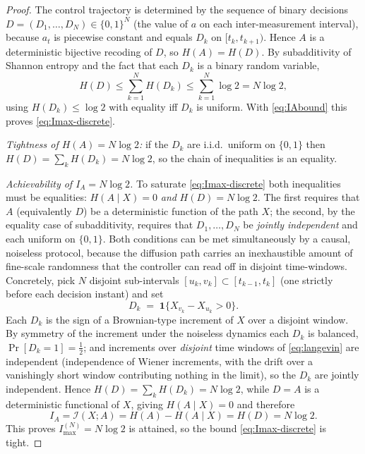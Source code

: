 \documentclass{amsart}
\theoremstyle{definition}
\begin{document}
\begin{proof}
The control trajectory is determined by the sequence of binary decisions
$D=(D_1,\dots,D_N)\in\{0,1\}^N$ (the value of $a$ on each inter-measurement
interval), because $a_t$ is piecewise constant and equals $D_k$ on
$[t_k,t_{k+1})$. Hence $A$ is a deterministic bijective recoding of $D$, so
$H(A)=H(D)$. By subadditivity of Shannon entropy and the fact that each $D_k$
is a binary random variable,
\[
H(D)\le\sum_{k=1}^N H(D_k)\le \sum_{k=1}^N \log 2 = N\log 2,
\]
using $H(D_k)\le\log 2$ with equality iff $D_k$ is uniform. With
\eqref{eq:IAbound} this proves \eqref{eq:Imax-discrete}.

\emph{Tightness of $H(A)=N\log2$:} if the $D_k$ are i.i.d.\ uniform on
$\{0,1\}$ then $H(D)=\sum_k H(D_k)=N\log2$, so the chain of inequalities is an
equality.

\emph{Achievability of $I_A=N\log 2$.} To saturate \eqref{eq:Imax-discrete}
both inequalities must be equalities: $H(A\mid X)=0$ \emph{and} $H(D)=N\log2$.
The first requires that $A$ (equivalently $D$) be a deterministic function of
the path $X$; the second, by the equality case of subadditivity, requires that
$D_1,\dots,D_N$ be \emph{jointly independent} and each uniform on $\{0,1\}$.
Both conditions can be met simultaneously by a causal, noiseless protocol,
because the diffusion path carries an inexhaustible amount of fine-scale
randomness that the controller can read off in disjoint time-windows. Concretely,
pick $N$ disjoint sub-intervals $[u_k,v_k]\subset[t_{k-1},t_k]$ (one strictly
before each decision instant) and set
\[
D_k \;=\; \mathbf 1\{X_{v_k}-X_{u_k}>0\}.
\]
Each $D_k$ is the sign of a Brownian-type increment of $X$ over a disjoint
window. By symmetry of the increment under the noiseless dynamics each $D_k$ is
balanced, $\Pr[D_k=1]=\tfrac12$; and increments over \emph{disjoint} time
windows of \eqref{eq:langevin} are independent (independence of Wiener
increments, with the drift over a vanishingly short window contributing
nothing in the limit), so the $D_k$ are jointly independent. Hence
$H(D)=\sum_k H(D_k)=N\log2$, while $D=A$ is a deterministic functional of $X$,
giving $H(A\mid X)=0$ and therefore
\[
I_A=\mathcal I(X;A)=H(A)-H(A\mid X)=H(D)=N\log2 .
\]
This proves $I_{\max}^{(N)}=N\log2$ is attained, so the bound
\eqref{eq:Imax-discrete} is tight.


\end{proof}
\end{document}
